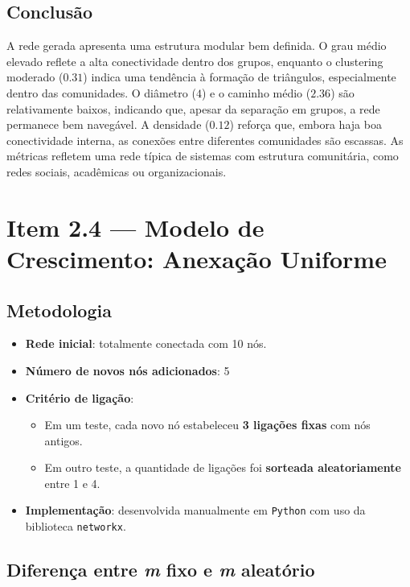 \documentclass{article}
\begin{document}
\subsection*{Conclusão}

A rede gerada apresenta uma estrutura modular bem definida. O grau médio elevado reflete a alta conectividade dentro dos grupos, enquanto o clustering moderado (\(0.31\)) indica uma tendência à formação de triângulos, especialmente dentro das comunidades. O diâmetro (\(4\)) e o caminho médio (\(2.36\)) são relativamente baixos, indicando que, apesar da separação em grupos, a rede permanece bem navegável. A densidade (\(0.12\)) reforça que, embora haja boa conectividade interna, as conexões entre diferentes comunidades são escassas. As métricas refletem uma rede típica de sistemas com estrutura comunitária, como redes sociais, acadêmicas ou organizacionais.

\newpage

\section*{Item 2.4 — Modelo de Crescimento: Anexação Uniforme}


\subsection*{Metodologia}

\begin{itemize}
    \item \textbf{Rede inicial}: totalmente conectada com 10 nós.
    \item \textbf{Número de novos nós adicionados}: 5
    \item \textbf{Critério de ligação}:
    \begin{itemize}
        \item Em um teste, cada novo nó estabeleceu \textbf{3 ligações fixas} com nós antigos.
        \item Em outro teste, a quantidade de ligações foi \textbf{sorteada aleatoriamente} entre 1 e 4.
    \end{itemize}
    \item \textbf{Implementação}: desenvolvida manualmente em \texttt{Python} com uso da biblioteca \texttt{networkx}.
\end{itemize}


\subsection*{Diferença entre \textit{m} fixo e \textit{m} aleatório}
\end{document}
